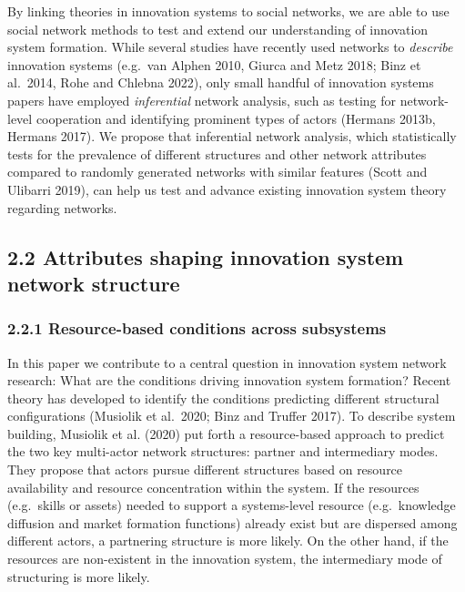 \documentclass[twoside,12pt,final]{ucthesis-CA2012}
\begin{document}
\begin{ucmainmatter}
By linking theories in innovation systems to social networks, we are
able to use social network methods to test and extend our understanding
of innovation system formation. While several studies have recently used
networks to \emph{describe} innovation systems (e.g.~van Alphen 2010, Giurca
and Metz 2018; Binz et al.~2014, Rohe and Chlebna 2022), only small
handful of innovation systems papers have employed \emph{inferential} network
analysis, such as testing for network-level cooperation and identifying
prominent types of actors (Hermans 2013b, Hermans 2017). We propose that
inferential network analysis, which statistically tests for the
prevalence of different structures and other network attributes compared
to randomly generated networks with similar features (Scott and Ulibarri
2019), can help us test and advance existing innovation system theory
regarding networks.

\hypertarget{attributes-shaping-innovation-system-network-structure}{%
\subsection{2.2 Attributes shaping innovation system network structure}\label{attributes-shaping-innovation-system-network-structure}}

\hypertarget{resource-based-conditions-across-subsystems}{%
\subsubsection{2.2.1 Resource-based conditions across subsystems}\label{resource-based-conditions-across-subsystems}}

In this paper we contribute to a central question in innovation system
network research: What are the conditions driving innovation system
formation? Recent theory has developed to identify the conditions
predicting different structural configurations (Musiolik et al.~2020;
Binz and Truffer 2017). To describe system building, Musiolik et al.
(2020) put forth a resource-based approach to predict the two key
multi-actor network structures: partner and intermediary modes. They
propose that actors pursue different structures based on resource
availability and resource concentration within the system. If the
resources (e.g.~skills or assets) needed to support a systems-level
resource (e.g.~knowledge diffusion and market formation functions)
already exist but are dispersed among different actors, a partnering
structure is more likely. On the other hand, if the resources are
non-existent in the innovation system, the intermediary mode of
structuring is more likely.


\end{ucmainmatter}
\end{document}

